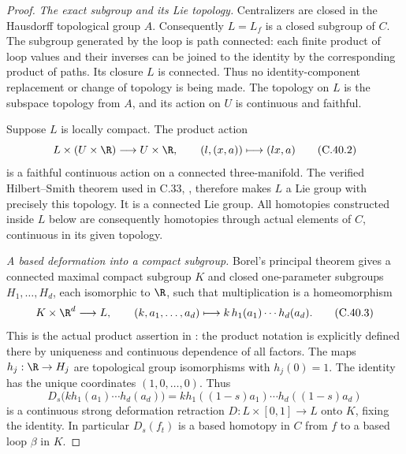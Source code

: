 \begin{proof}
\emph{The exact subgroup and its Lie topology.}
Centralizers are closed in the Hausdorff topological
group $A$. Consequently $L=L_f$ is a closed subgroup
of $C$. The subgroup generated by the loop is
path connected: each finite product of loop values
and their inverses can be joined to the identity by
the corresponding product of paths. Its closure $L$
is connected. Thus no identity-component replacement
or change of topology is being made.
The topology on $L$ is the subspace topology from
$A$, and its action on $U$ is continuous and faithful.

Suppose $L$ is locally compact. The product action
\[
 L\times(U\times\R)\longrightarrow U\times\R,
       \qquad (l,(x,a))\longmapsto(lx,a)
                                                        \tag{C.40.2}
\]
is a faithful continuous action on a connected
three-manifold. The verified Hilbert--Smith theorem
used in C.33, \cite[Theorem 1.5 and the introductory
reduction]{C_Pardon2013}, therefore makes $L$ a Lie
group with precisely this topology. It is a connected
Lie group. All homotopies constructed inside $L$ below
are consequently homotopies through actual elements
of $C$, continuous in its given topology.

\emph{A based deformation into a compact subgroup.}
Borel's principal theorem gives a connected maximal
compact subgroup $K$ and closed one-parameter
subgroups $H_1,\ldots,H_d$, each isomorphic to $\R$,
such that multiplication is a homeomorphism
\[
 K\times\R^d\longrightarrow L,\qquad
 (k,a_1,\ldots,a_d)\longmapsto
       k\,h_1(a_1)\cdots h_d(a_d).
                                                        \tag{C.40.3}
\]
This is the actual product assertion in
\cite[\S1, p.~271; \S\S3--4, pp.~277--278]{C_Borel1952}:
the product notation is explicitly defined there
by uniqueness and continuous dependence of all
factors. The maps $h_j:\R\to H_j$ are topological
group isomorphisms with $h_j(0)=1$.
The identity has the unique coordinates $(1,0,\ldots,0)$.
Thus
\[
 D_s\bigl(kh_1(a_1)\cdots h_d(a_d)\bigr)
       =k h_1((1-s)a_1)\cdots h_d((1-s)a_d)
                                                        \tag{C.40.4}
\]
is a continuous strong deformation retraction
$D:L\times[0,1]\to L$ onto $K$, fixing the identity.
In particular $D_s(f_t)$ is a based homotopy in
$C$ from $f$ to a based loop $\beta$ in $K$.


\end{proof}
